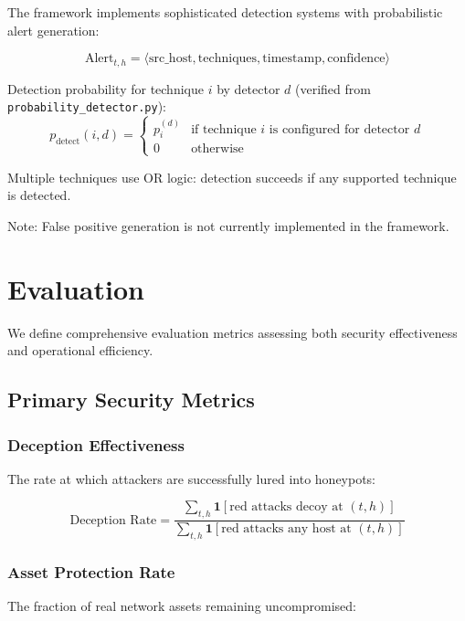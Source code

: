 \documentclass[12pt,twoside]{article}
\theoremstyle{definition}
\theoremstyle{plain}
\begin{document}
The framework implements sophisticated detection systems with probabilistic alert generation:

\begin{equation}
\text{Alert}_{t,h} = \langle \text{src\_host}, \text{techniques}, \text{timestamp}, \text{confidence} \rangle
\end{equation}

Detection probability for technique $i$ by detector $d$ (verified from \texttt{probability\_detector.py}):
\begin{equation}
p_{\text{detect}}(i, d) = \begin{cases}
p_i^{(d)} & \text{if technique } i \text{ is configured for detector } d \\
0 & \text{otherwise}
\end{cases}
\end{equation}

Multiple techniques use OR logic: detection succeeds if any supported technique is detected.

Note: False positive generation is not currently implemented in the framework.

\section{Evaluation}

We define comprehensive evaluation metrics assessing both security effectiveness and operational efficiency.

\subsection{Primary Security Metrics}

\subsubsection{Deception Effectiveness}
The rate at which attackers are successfully lured into honeypots:

\begin{equation}
\text{Deception Rate} = \frac{\sum_{t,h} \mathbf{1}[\text{red attacks decoy at } (t,h)]}{\sum_{t,h} \mathbf{1}[\text{red attacks any host at } (t,h)]}
\end{equation}

\subsubsection{Asset Protection Rate}
The fraction of real network assets remaining uncompromised:
\end{document}
